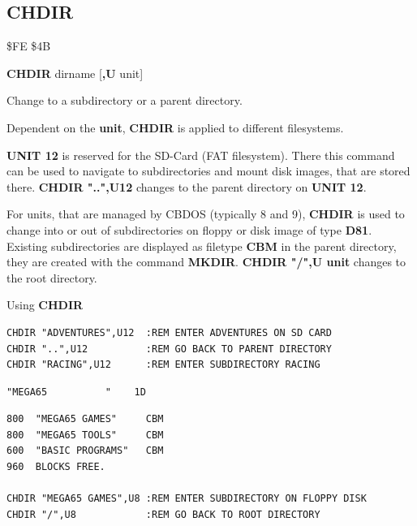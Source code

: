 
\newpage
\subsection{CHDIR}
\begin{description}[leftmargin=2cm,style=nextline]
\item [Token:] \$FE \$4B
\item [Format:] {\bf CHDIR} dirname [{\bf,U} unit]
\item [Usage:] Change to a subdirectory or a parent directory.

   \filenamedefinition

   Dependent on the {\bf unit}, {\bf CHDIR} is applied to
   different filesystems.

   {\bf UNIT 12} is reserved for the SD-Card (FAT filesystem).
   There this command can be used to navigate to subdirectories
   and mount disk images, that are stored there.
   {\bf CHDIR "..",U12} changes to the parent directory on {\bf UNIT 12}.

   For units, that are managed by CBDOS (typically 8 and 9),
   {\bf CHDIR} is used to change into or out of subdirectories
   on floppy or disk image of type {\bf D81}.
   Existing subdirectories are displayed as filetype {\bf CBM}
   in the parent directory, they are created with the command {\bf MKDIR}.
   {\bf CHDIR "/",U unit} changes to the root directory.

\item [Examples:] Using {\bf CHDIR}
\begin{tcolorbox}[colback=black,coltext=white]
\verbatimfont{\codefont}
\begin{verbatim}
CHDIR "ADVENTURES",U12  :REM ENTER ADVENTURES ON SD CARD
CHDIR "..",U12          :REM GO BACK TO PARENT DIRECTORY
CHDIR "RACING",U12      :REM ENTER SUBDIRECTORY RACING
\end{verbatim}

\selectfont{\codefont 0}
\begin{tcolorbox}[colback=white,coltext=black,arc=0mm,boxrule=0mm,
       left*=0.5mm,right*=0mm,top=0mm,bottom=0mm,nobeforeafter,
       left skip=0.5mm,
       width=28mm,height=3mm,valign=center]
\begin{verbatim}
"MEGA65          "    1D
\end{verbatim}
\end{tcolorbox}
\begin{verbatim}
800  "MEGA65 GAMES"     CBM
800  "MEGA65 TOOLS"     CBM
600  "BASIC PROGRAMS"   CBM
960  BLOCKS FREE.

CHDIR "MEGA65 GAMES",U8 :REM ENTER SUBDIRECTORY ON FLOPPY DISK
CHDIR "/",U8            :REM GO BACK TO ROOT DIRECTORY
\end{verbatim}
\end{tcolorbox}
\end{description}

